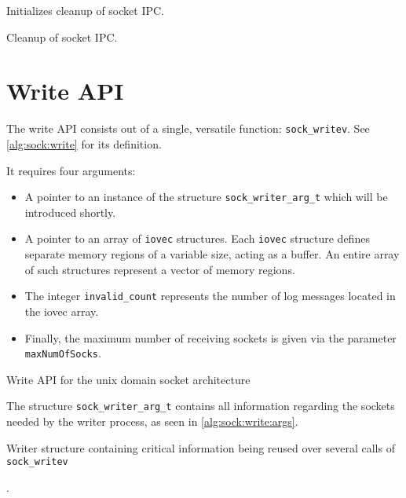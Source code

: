 \begin{algorithm}[h!]
    
    \caption[Socket: Socket finalization]{Initializes cleanup of socket IPC.}
    \label{alg:sock:finalize}
\end{algorithm}

\begin{algorithm}[h!]
    
    \caption[Socket: Socket cleanup]{Cleanup of socket IPC.}
    \label{alg:sock:cleanup}
\end{algorithm}

\section{Write API}
The write API consists out of a single, versatile function\@: \texttt{sock\_writev}.
See \ref{alg:sock:write} for its definition.

It requires four arguments:
\begin{itemize}
    \item A pointer to an instance of the structure \texttt{sock\_writer\_arg\_t} which will be introduced shortly.
    \item A pointer to an array of \texttt{iovec} structures.
            Each \texttt{iovec} structure defines separate memory regions of a variable size, acting as a buffer.
            An entire array of such structures represent a vector of memory regions\cite{man:iovec}.
    \item The integer \texttt{invalid\_count} represents the number of log messages located in the iovec array.
    \item Finally, the maximum number of receiving sockets is given via the parameter \texttt{maxNumOfSocks}.
\end{itemize}

\begin{algorithm}[h!]
    
    \caption[Socket: Write API]{Write API for the unix domain socket architecture}
    \label{alg:sock:write}
\end{algorithm}

The structure \texttt{sock\_writer\_arg\_t} contains all information regarding the sockets needed by the writer process, as seen in \ref{alg:sock:write:args}.

\begin{algorithm}[h!]
    
    \caption[Socket: Writer structure]{Writer structure containing critical information being reused over several calls of \texttt{sock\_writev}}.
    \label{alg:sock:write:args}
\end{algorithm}

